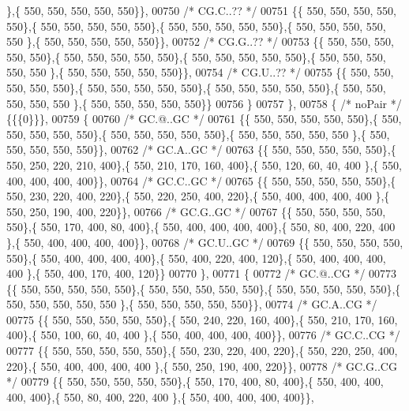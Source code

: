 \begin{DoxyCode}
      \},\{ 550, 550, 550, 550, 550\}\},
00750 \textcolor{comment}{/* CG.C..?? */}
00751 \{\{ 550, 550, 550, 550, 550\},\{ 550, 550, 550, 550, 550\},\{ 550, 550, 550, 550, 550\},\{ 550, 550, 550, 550, 550
      \},\{ 550, 550, 550, 550, 550\}\},
00752 \textcolor{comment}{/* CG.G..?? */}
00753 \{\{ 550, 550, 550, 550, 550\},\{ 550, 550, 550, 550, 550\},\{ 550, 550, 550, 550, 550\},\{ 550, 550, 550, 550, 550
      \},\{ 550, 550, 550, 550, 550\}\},
00754 \textcolor{comment}{/* CG.U..?? */}
00755 \{\{ 550, 550, 550, 550, 550\},\{ 550, 550, 550, 550, 550\},\{ 550, 550, 550, 550, 550\},\{ 550, 550, 550, 550, 550
      \},\{ 550, 550, 550, 550, 550\}\}
00756 \}
00757 \},
00758 \{ \textcolor{comment}{/* noPair */} \{\{\{0\}\}\},
00759 \{
00760 \textcolor{comment}{/* GC.@..GC */}
00761 \{\{ 550, 550, 550, 550, 550\},\{ 550, 550, 550, 550, 550\},\{ 550, 550, 550, 550, 550\},\{ 550, 550, 550, 550, 550
      \},\{ 550, 550, 550, 550, 550\}\},
00762 \textcolor{comment}{/* GC.A..GC */}
00763 \{\{ 550, 550, 550, 550, 550\},\{ 550, 250, 220, 210, 400\},\{ 550, 210, 170, 160, 400\},\{ 550, 120,  60,  40, 400
      \},\{ 550, 400, 400, 400, 400\}\},
00764 \textcolor{comment}{/* GC.C..GC */}
00765 \{\{ 550, 550, 550, 550, 550\},\{ 550, 230, 220, 400, 220\},\{ 550, 220, 250, 400, 220\},\{ 550, 400, 400, 400, 400
      \},\{ 550, 250, 190, 400, 220\}\},
00766 \textcolor{comment}{/* GC.G..GC */}
00767 \{\{ 550, 550, 550, 550, 550\},\{ 550, 170, 400,  80, 400\},\{ 550, 400, 400, 400, 400\},\{ 550,  80, 400, 220, 400
      \},\{ 550, 400, 400, 400, 400\}\},
00768 \textcolor{comment}{/* GC.U..GC */}
00769 \{\{ 550, 550, 550, 550, 550\},\{ 550, 400, 400, 400, 400\},\{ 550, 400, 220, 400, 120\},\{ 550, 400, 400, 400, 400
      \},\{ 550, 400, 170, 400, 120\}\}
00770 \},
00771 \{
00772 \textcolor{comment}{/* GC.@..CG */}
00773 \{\{ 550, 550, 550, 550, 550\},\{ 550, 550, 550, 550, 550\},\{ 550, 550, 550, 550, 550\},\{ 550, 550, 550, 550, 550
      \},\{ 550, 550, 550, 550, 550\}\},
00774 \textcolor{comment}{/* GC.A..CG */}
00775 \{\{ 550, 550, 550, 550, 550\},\{ 550, 240, 220, 160, 400\},\{ 550, 210, 170, 160, 400\},\{ 550, 100,  60,  40, 400
      \},\{ 550, 400, 400, 400, 400\}\},
00776 \textcolor{comment}{/* GC.C..CG */}
00777 \{\{ 550, 550, 550, 550, 550\},\{ 550, 230, 220, 400, 220\},\{ 550, 220, 250, 400, 220\},\{ 550, 400, 400, 400, 400
      \},\{ 550, 250, 190, 400, 220\}\},
00778 \textcolor{comment}{/* GC.G..CG */}
00779 \{\{ 550, 550, 550, 550, 550\},\{ 550, 170, 400,  80, 400\},\{ 550, 400, 400, 400, 400\},\{ 550,  80, 400, 220, 400
      \},\{ 550, 400, 400, 400, 400\}\},

\end{DoxyCode}
